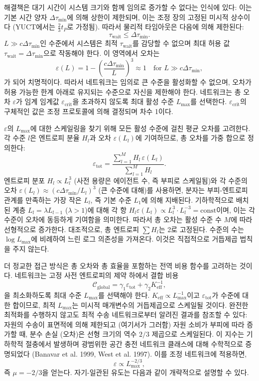 \documentclass[11pt,a4paper]{article}
\begin{document}
	해결책은 대기 시간이 시스템 크기와 함께 임의로 증가할 수 없다는 인식에 있다: 이는 기본 시간 양자 \(\Delta\tau_{\min}\)에 의해 상한이 제한되며, 이는 조정 장의 고정된 미시적 상수이다 (YUCT에서는 \(\frac23 t_P\)로 가정됨). 따라서 물리적 타임아웃은 다음에 의해 제한된다:
	\[
	\tau_{\mathrm{wait}} \le \Delta\tau_{\min}.
	\]
	\(L \gg c\Delta\tau_{\min}\)인 수준에서 시스템은 최적 \(\tau_{\mathrm{wait}}\)를 감당할 수 없으며 최대 허용 값 \(\tau_{\mathrm{wait}} = \Delta\tau_{\min}\)으로 작동해야 한다. 이 영역에서 오차는
	\[
	\varepsilon(L) = 1 - \left(\frac{c\Delta\tau_{\min}}{L}\right)^3 \approx 1 \quad\text{for } L \gg c\Delta\tau_{\min},
	\]
	가 되어 치명적이다. 따라서 네트워크는 임의로 큰 수준을 활성화할 수 없으며, 오차가 허용 가능한 한계 아래로 유지되는 수준으로 자신을 제한해야 한다. 네트워크는 총 오차 \(\varepsilon\)가 임계 임계값 \(\varepsilon_{\mathrm{crit}}\)을 초과하지 않도록 최대 활성 수준 \(L_{\max}\)를 선택한다. \(\varepsilon_{\mathrm{crit}}\)의 구체적인 값은 조정 프로토콜에 의해 결정되며 차수 1이다.
	
	\(\varepsilon\)의 \(L_{\max}\)에 대한 스케일링을 찾기 위해 모든 활성 수준에 걸친 평균 오차를 고려한다. 각 수준 \(l\)은 엔트로피 분율 \(H_l\)과 오차 \(\varepsilon(L_l)\)에 기여하므로, 총 오차를 가중 합으로 정의한다:
	\[
	\varepsilon_{\mathrm{tot}} = \frac{\sum_{l=1}^{M} H_l\, \varepsilon(L_l)}{\sum_{l=1}^{M} H_l}.
	\]
	엔트로피 분포 \(H_l \propto L_l^3\) (사전 용량은 에이전트 수, 즉 부피로 스케일됨)와 각 수준의 오차 \(\varepsilon(L_l) \approx (c\Delta\tau_{\min}/L_l)^3\) (큰 수준에 대해)를 사용하면, 분자는 부피-엔트로피 관계를 만족하는 가장 작은 \(L_l\), 즉 기본 수준 \(L_1\)에 의해 지배된다. 기하학적으로 배치된 계층 \(L_l = \lambda L_{l-1}\) (\(\lambda > 1\))에 대해 각 항 \(H_l\varepsilon(L_l) \propto L_l^3 \cdot L_l^{-3} = \text{const}\)이며, 이는 각 수준이 오차에 동등하게 기여함을 의미한다. 따라서 총 오차는 활성 수준 수 \(M\)에 따라 선형적으로 증가한다. 대조적으로, 총 엔트로피 \(\sum H_l\)는 2로 고정된다. 수준의 수는 \(\log L_{\max}\)에 비례하여 느린 로그 의존성을 가져온다. 이것은 직접적으로 거듭제곱 법칙을 주지 않는다.
	
	더 정교한 접근 방식은 총 오차와 총 효율을 포함하는 전역 비용 함수를 고려하는 것이다. 네트워크는 고정 사전 엔트로피의 제약 하에서 결합 비용
	\[
	\mathcal{C}_{\mathrm{global}} = \gamma_1 \varepsilon_{\mathrm{tot}} + \gamma_2 K_{\mathrm{eff}}^{-1},
	\]
	을 최소화하도록 최대 수준 \(L_{\max}\)를 선택해야 한다. \(K_{\mathrm{eff}} \propto L_{\max}^{-1}\)이고 \(\varepsilon_{\mathrm{tot}}\)가 수준에 대한 합이므로, 최적 \(L_{\max}\)는 미시적 매개변수의 거듭제곱으로 스케일될 것이다. 완전한 최적화를 수행하지 않고도 최적 수송 네트워크로부터 알려진 결과를 참조할 수 있다: 자원의 수송이 표면적에 의해 제한되고 (여기서가 그러함) 자원 소비가 부피에 따라 증가할 때, 분수 손실 (오차)은 선형 크기의 역수 \(2/3\) 제곱으로 스케일된다. 이 지수는 기하학적 절충에서 발생하며 광범위한 공간 충전 네트워크 클래스에 대해 수학적으로 증명되었다 (Banavar et al. 1999, West et al. 1997). 이를 조정 네트워크에 적용하면,
	\[
	\varepsilon \propto L_{\max}^{-2/3},
	\]
	즉 \(\mu = -2/3\)을 얻는다. 자기-일관된 유도는 다음과 같이 개략적으로 설명할 수 있다.
	
\end{document}
